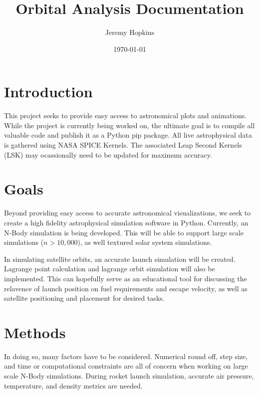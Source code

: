 \documentclass{article}
\title{Orbital Analysis Documentation}
\author{Jeremy Hopkins}
\date{\today}
\begin{document}
\maketitle

\tableofcontents

\clearpage

\section{Introduction}

This project seeks to provide easy access to astronomical plots and animations. While the project is currently being worked on, the ultimate goal is to compile all valuable code and publish it as a Python pip package. All live astrophysical data is gathered using NASA SPICE Kernels. The associated Leap Second Kernels (LSK) may ocassionally need to be updated for maximum accuracy.

\section{Goals}

Beyond providing easy access to accurate astronomical visualizations, we seek to create a high fidelity astrophysical simulation software in Python. Currently, an N-Body simulation is being developed. This will be able to support large scale simulations ($n>10,000$), as well textured solar system simulations. 

In simulating satellite orbits, an accurate launch simulation will be created. Lagrange point calculation and lagrange orbit simulation will also be implemented. This can hopefully serve as an educational tool for discussing the relavence of launch position on fuel requirements and escape velocity, as well as satellite positioning and placement for desired tasks.

\section{Methods}
In doing so, many factors have to be considered.
Numerical round off, step size, and time or computational constraints are all of concern when working on large scale N-Body simulations. During rocket launch simulation, accurate air pressure, temperature, and density metrics are needed.
\end{document}
